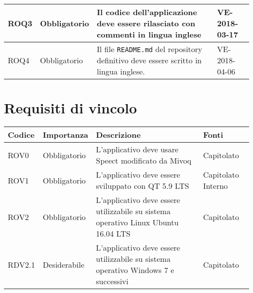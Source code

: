 \documentclass[../AnalisideiRequisiti.tex]{subfiles}
\begin{document}
\begin{longtable}{| p{2cm} | p{2.5cm} |p{5cm} | p{2.5cm} |}
			\\[1em]
			\hline	
			\newline
			ROQ3&\newline Obbligatorio&
			\newline 
			Il codice dell'applicazione deve essere rilasciato con commenti in lingua inglese&
			\newline VE-2018-03-17
			\\[1em]
			\hline	
			\newline
			ROQ4&\newline Obbligatorio&
			\newline 
			Il file \verb|README.md| del repository definitivo deve essere scritto in lingua inglese.&
			\newline VE-2018-04-06
			\\[1em]
			\hline
	\end{longtable}
\newpage
	\section{Requisiti di vincolo}
			\begin{longtable}{| p{2cm} | p{2.5cm} |p{5cm} | p{2.5cm} |}
			\hline
			\textbf{Codice} & \textbf{Importanza} & \textbf{Descrizione} & \textbf{Fonti}\\
			\hline
			\endhead
				\newline ROV0&\newline Obbligatorio&
			\newline 
			L'applicativo deve usare Speect modificato da Mivoq &
			\newline Capitolato
			\\[1em]
			\hline	
			\newline 
			ROV1&\newline Obbligatorio&
			\newline 
			L'applicativo deve essere sviluppato con QT 5.9 LTS &
			\newline Capitolato
			\newline Interno
			\\[1em]
			\hline
			\newline 
			ROV2&\newline Obbligatorio&
			\newline 
			L'applicativo deve essere utilizzabile su sistema operativo Linux Ubuntu 16.04 LTS&
			\newline Capitolato
			\\[1em]
			\hline
			\newline
			RDV2.1&\newline Desiderabile&
			\newline 
			L'applicativo deve essere utilizzabile su sistema operativo Windows 7 e successivi&
			\newline Capitolato
			\\[1em]
			\hline
	\end{longtable}
\newpage
\end{document}
